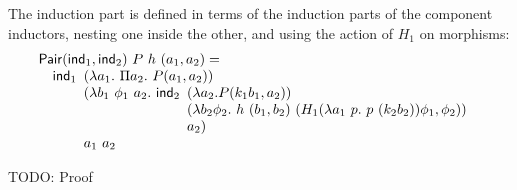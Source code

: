 \documentclass{article}
\begin{document}
The induction part is defined in terms of the induction parts of the
component inductors, nesting one inside the other, and using the
action of $H_1$ on morphisms:
\begin{displaymath}
  \begin{array}[t]{l}
    \mathsf{Pair}(\ind_1, \ind_2)\ P\ h\ (a_1,a_2) = \\
    \quad \ind_1
    \begin{array}[t]{l}
      (\lambda a_1.\ \Pi a_2.\ P(a_1,a_2)) \\
      (\lambda b_1\ \phi_1\ a_2.\ \ind_2
      \begin{array}[t]{l}
        (\lambda a_2. P(k_1b_1,a_2)) \\
        (\lambda b_2 \phi_2.\ h\ (b_1,b_2)\ (H_1(\lambda a_1\ p.\ p\ (k_2b_2))\phi_1,\phi_2)) \\
        a_2)
      \end{array} \\
      a_1\ a_2
    \end{array}
  \end{array}
\end{displaymath}

TODO: Proof



\end{document}
